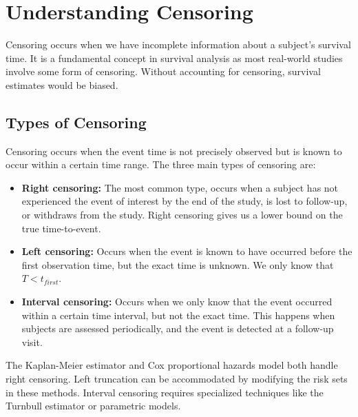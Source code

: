 \section{Understanding Censoring}
\label{sec:understanding-censoring}

Censoring occurs when we have incomplete information about a subject's survival time. It is a fundamental concept in survival analysis as most real-world studies involve some form of censoring. Without accounting for censoring, survival estimates would be biased.

\subsection{Types of Censoring}
\label{subsec:types-of-censoring}



\begin{definitionbox}[title=Censoring Types]
Censoring occurs when the event time is not precisely observed but is known to occur within a certain time range. The three main types of censoring are:
\begin{itemize}
    \item \textbf{Right censoring:} The most common type, occurs when a subject has not experienced the event of interest by the end of the study, is lost to follow-up, or withdraws from the study. Right censoring gives us a lower bound on the true time-to-event.

    \item \textbf{Left censoring:} Occurs when the event is known to have occurred before the first observation time, but the exact time is unknown. We only know that $T < t_{first}$.

    \item \textbf{Interval censoring:} Occurs when we only know that the event occurred within a certain time interval, but not the exact time. This happens when subjects are assessed periodically, and the event is detected at a follow-up visit.
\end{itemize}
\end{definitionbox}

The Kaplan-Meier estimator and Cox proportional hazards model both handle right censoring. Left truncation can be accommodated by modifying the risk sets in these methods. Interval censoring requires specialized techniques like the Turnbull estimator or parametric models.

